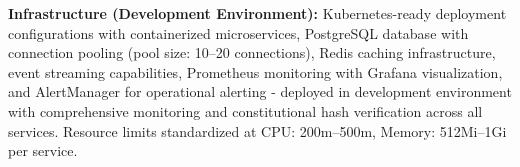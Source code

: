 \documentclass[manuscript,screen,9pt]{acmart}
\begin{document}
\textbf{Infrastructure (Development Environment):}
Kubernetes-ready deployment configurations with containerized microservices, PostgreSQL database with connection pooling (pool size: 10--20 connections), Redis caching infrastructure, event streaming capabilities, Prometheus monitoring with Grafana visualization, and AlertManager for operational alerting - deployed in development environment with comprehensive monitoring and constitutional hash verification across all services. Resource limits standardized at CPU: 200m--500m, Memory: 512Mi--1Gi per service.
\end{document}
